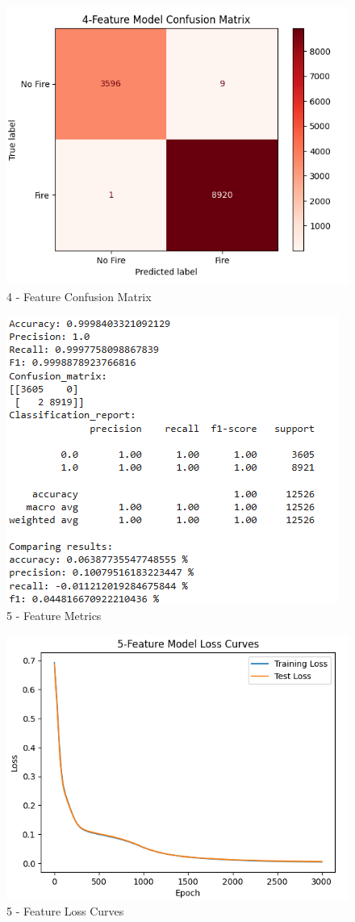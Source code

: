 \documentclass[conference]{IEEEtran}
\begin{document}
\begin{figure}[htbp]
    \centering
    \includegraphics[width=0.75\linewidth]{images/4CM.png}
    \caption{4 - Feature Confusion Matrix}
    \label{fig:4cm}
\end{figure}

\begin{figure}[htbp]
    \centering
    \includegraphics[width=0.75\linewidth]{images/5metric.png}
    \caption{5 - Feature Metrics}
    \label{fig:5met}
\end{figure}

\begin{figure}[htbp]
    \centering
    \includegraphics[width=0.75\linewidth]{images/5LC.png}
    \caption{5 - Feature Loss Curves}
    \label{fig:5loss}
\end{figure}
\end{document}
